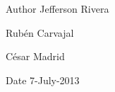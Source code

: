 \begin{DoxyAuthor}{Author}
Jefferson Rivera 

Rubén Carvajal 

César Madrid 
\end{DoxyAuthor}
\begin{DoxyDate}{Date}
7-\/\-July-\/2013 
\end{DoxyDate}
